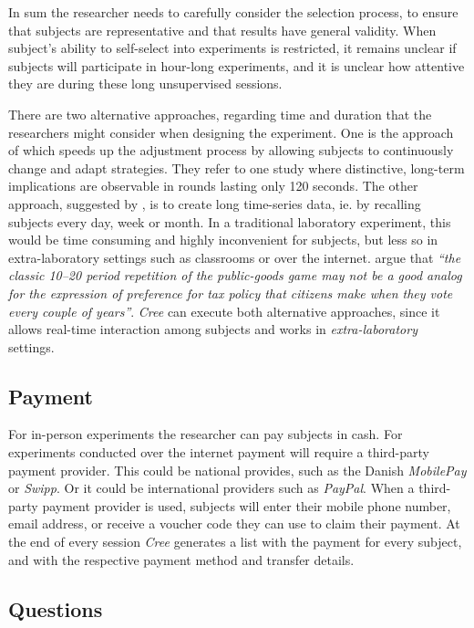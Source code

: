 \documentclass[preprint, 12pt]{elsarticle}
\newcommand{\Cree}{\emph{Cree}\xspace}
\begin{document}
In sum the researcher needs to carefully consider the selection process, to ensure that subjects are representative and that results have general validity. When subject's ability to self-select into experiments is restricted, it remains unclear if subjects will participate in hour-long experiments, and it is unclear how attentive they are during these long unsupervised sessions.

There are two alternative approaches, regarding time and duration that the researchers might consider when designing the experiment. One is the approach of \citet*{Pettit_Friedman_Kephart_Oprea_2014} which speeds up the adjustment process by allowing subjects to continuously change and adapt strategies. They refer to one study where distinctive, long-term implications are observable in rounds lasting only 120 seconds. The other approach, suggested by \cite{Charness_Gneezy_Kuhn_2013}, is to create long time-series data, ie. by recalling subjects every day, week or month. In a traditional laboratory experiment, this would be time consuming and highly inconvenient for subjects, but less so in extra-laboratory settings such as classrooms or over the internet. \cite[p. 96]{Charness_Gneezy_Kuhn_2013} argue that \emph{``the classic 10–20 period repetition of the public-goods game may not be a good analog for the expression of preference for tax policy that citizens make when they vote every couple of years''}. \Cree can execute both alternative approaches, since it allows real-time interaction among subjects and works in \emph{extra-laboratory} settings.

\subsection{Payment}

For in-person experiments the researcher can pay subjects in cash. For experiments conducted over the internet payment will require a third-party payment provider. This could be national provides, such as the Danish \emph{MobilePay} or \emph{Swipp}. Or it could be international providers such as \emph{PayPal}. When a third-party payment provider is used, subjects will enter their mobile phone number, email address, or receive a voucher code they can use to claim their payment. At the end of every session \Cree generates a list with the payment for every subject, and with the respective payment method and transfer details.

\subsection{Questions}
\end{document}
